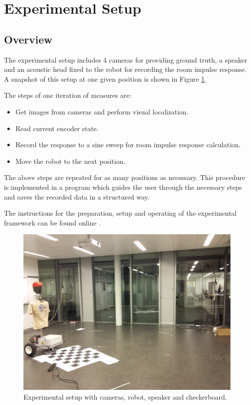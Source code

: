 \newpage
\section{Experimental Setup}

\subsection{Overview}

The experimental setup includes 4 cameras for providing ground truth, a speaker and an acoustic head fixed to the robot for recording the room impulse response. A snapshot of this setup at one given position is shown in Figure \ref{fig:overview}.

The steps of one iteration of measures are:
\begin{itemize}
    \item Get images from cameras and perform visual localization.
    \item Read current encoder state.
    \item Record the response to a sine sweep for room impulse response calculation. 
    \item Move the robot to the next position.
\end{itemize}

The above steps are repeated for as many positions as necessary. This procedure is implemented in a program which guides the user through the necessary steps and saves the recorded data in a structured way. 

The instructions for the preparation, setup and operating of the experimental framework can be found online \cite{Instructions}.
\begin{figure}[H]
    \centering
    \includegraphics[width=0.6\linewidth]{files/Overview.jpg}
    \caption{Experimental setup with cameras, robot, speaker and checkerboard.}
    \label{fig:overview}
\end{figure}
